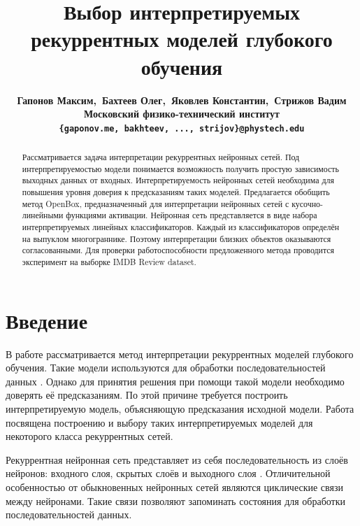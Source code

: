 \documentclass[a4paper, 12pt]{article}
\begin{document}
\title{Выбор интерпретируемых рекуррентных моделей глубокого обучения}
\author{\normalsize\bf{Гапонов Максим,~Бахтеев Олег,~Яковлев Константин,~Стрижов Вадим} \\
	Московский физико-технический институт \\
	\texttt{\{gaponov.me,~bakhteev,~...,~strijov\}@phystech.edu}
}
\date{}
\maketitle
\begin{abstract}
Рассматривается задача интерпретации рекуррентных нейронных сетей. Под интерпретируемостью модели понимается возможность получить простую зависимость выходных данных от входных. Интерпретируемость нейронных сетей необходима для повышения уровня доверия к предсказаниям таких моделей. Предлагается обобщить метод OpenBox, предназначенный для интерпретации нейронных сетей с кусочно-линейными функциями активации. Нейронная сеть представляется в виде набора интерпретируемых линейных классификаторов. Каждый из классификаторов определён на выпуклом многограннике. Поэтому интерпретации близких объектов оказываются согласованными. Для проверки работоспособности предложенного метода проводится эксперимент на выборке IMDB Review dataset.
\end{abstract}


\section{Введение}
В работе рассматривается метод интерпретации рекуррентных моделей глубокого обучения. Такие модели используются для обработки последовательностей данных \cite{lipton2015critical}. Однако для принятия решения при помощи такой модели необходимо доверять её предсказаниям. По этой причине требуется построить интерпретируемую модель, объясняющую предсказания исходной модели. Работа посвящена построению и выбору таких интерпретируемых моделей для некоторого класса рекуррентных сетей.

Рекуррентная нейронная сеть представляет из себя последовательность из слоёв нейронов: входного слоя, скрытых слоёв и выходного слоя \cite{sherstinsky2020fundrnn}. Отличительной особенностью от обыкновенных нейронных сетей являются циклические связи между нейронами. Такие связи позволяют запоминать состояния для обработки последовательностей данных.
\end{document}
